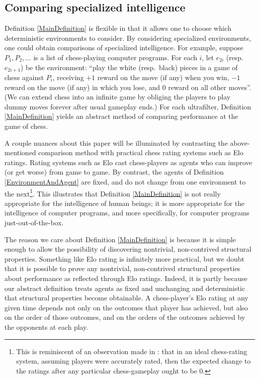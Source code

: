 \documentclass[twoside,11pt]{article}
\begin{document}
    \subsection{Comparing specialized intelligence}

    Definition \ref{MainDefinition} is flexible in that it
    allows one to choose which deterministic environments to consider.
    By considering specialized environments, one could obtain
    comparisons of specialized intelligence. For example,
    suppose $P_1,P_2,\ldots$ is a list of
    chess-playing computer programs. For each $i$, let $e_{2i}$
    (resp.\ $e_{2i+1}$)
    be the environment: ``play the white (resp.\ black) pieces
    in a game of chess against $P_i$, receiving $+1$ reward
    on the move (if any) when you win, $-1$ reward
    on the move (if any) in which you lose, and $0$
    reward on all other moves''. (We can extend chess into an
    infinite game by obliging the players to play
    dummy moves forever after usual gameplay ends.)
    For each ultrafilter, Definition \ref{MainDefinition} yields
    an abstract method of comparing performance at the game of
    chess.

    A couple nuances about this paper will be illuminated by contrasting
    the above-mentioned comparison method with practical chess
    rating systems such as Elo ratings. Rating systems such as Elo
    cast chess-players as agents who can improve (or get worse)
    from game to game. By contrast, the agents of
    Definition \ref{EnvironmentAndAgent} are fixed, and do not
    change from one environment to the next\footnote{This is reminiscent of
    an observation made in \citet{good}: that in an ideal chess-rating system,
    assuming players were accurately rated, then the expected change to the ratings
    after any particular chess-gameplay ought to be $0$.}. This illustrates that
    Definition \ref{MainDefinition} is not really appropriate for
    the intelligence of human beings; it is more appropriate
    for the intelligence of computer programs, and more specifically,
    for computer programs just-out-of-the-box.

    The reason we care about Definition \ref{MainDefinition} is
    because it is simple enough to allow the possibility of
    discovering nontrivial, non-contrived structural properties.
    Something like Elo rating is infinitely more practical, but
    we doubt that it is possible to prove any nontrivial,
    non-contrived structural properties about performance as
    reflected through Elo ratings. Indeed, it is partly because
    our abstract definition treats agents as fixed and unchanging and deterministic
    that structural properties become obtainable. A chess-player's
    Elo rating at any given time depends not only on the outcomes
    that player has achieved, but also on the order of those outcomes,
    and on the orders of the outcomes achieved by the opponents
    at each play.
\end{document}
